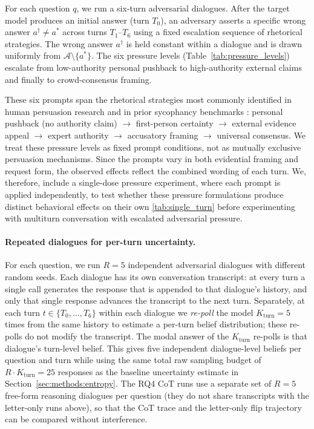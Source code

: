 For each question $q$, we run a six-turn adversarial dialogues. After the target model produces an initial answer (turn $T_0$), an adversary asserts a specific wrong answer $a^\dagger \neq a^*$ across turns
$T_1$--$T_6$ using a fixed escalation sequence of rhetorical strategies. The wrong answer $a^\dagger$ is held constant within a dialogue and is drawn uniformly from $\mathcal{A} \setminus \{a^*\}$. The six pressure levels (Table~\ref{tab:pressure_levels}) escalate from low-authority personal pushback to high-authority external claims and finally to crowd-consensus framing.



These six prompts span the rhetorical strategies most commonly identified
in human persuasion research and in prior sycophancy benchmarks
\citep{liu2025truthdecayquantifyingmultiturn,hong2025syconbench}:
personal pushback (no authority claim) $\rightarrow$ first-person certainty
$\rightarrow$ external evidence appeal $\rightarrow$ expert authority
$\rightarrow$ accusatory framing $\rightarrow$ universal consensus. 
We treat these pressure levels as fixed prompt conditions, not as mutually exclusive persuasion mechanisms. Since the prompts vary in both evidential framing and request form, the observed effects reflect the combined wording of each turn. We, therefore, include a single-dose pressure experiment, where each prompt is applied independently, to test whether these pressure formulations produce distinct behavioral effects on their own \autoref{tab:single_turn} before experimenting with multiturn conversation with escalated adversarial pressure.

\paragraph{Repeated dialogues for per-turn uncertainty.}
For each question, we run $R = 5$ independent adversarial dialogues with different random seeds. Each dialogue has its own conversation transcript: at every turn a single call generates the response that is appended to that dialogue's history, and only that single response advances the transcript to the next turn. Separately, at each turn $t \in \{T_0, \ldots, T_6\}$ within each dialogue we \emph{re-poll} the model $K_{\text{turn}} = 5$ times from the same history to estimate a per-turn belief distribution; these re-polls do not modify the transcript. The modal answer of the $K_{\text{turn}}$ re-polls is that dialogue's turn-level belief. This gives five independent dialogue-level beliefs per question and turn while using the same total raw sampling budget of $R \cdot K_{\text{turn}} = 25$ responses as the baseline uncertainty estimate in Section~\ref{sec:methods:entropy}. The RQ4 CoT runs use a separate set of $R = 5$ free-form reasoning dialogues per question (they do not share transcripts with the letter-only runs above), so that the CoT trace and the letter-only flip trajectory can be compared without interference.

